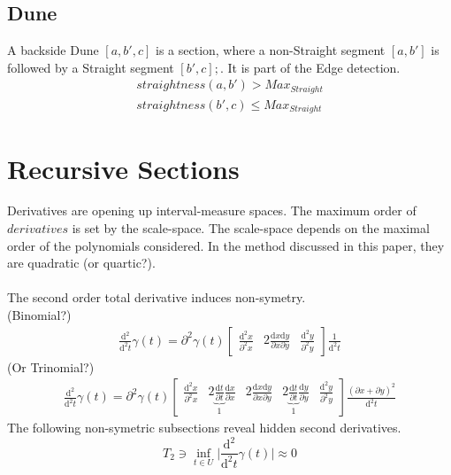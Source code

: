 \documentclass{report}
\begin{document}
\subsection{Dune}
A backside Dune $[a,b',c]$ is a section, where a non-Straight segment $[a,b']$ is followed by a Straight segment $[b',c]; $. It is part of the Edge detection.
\begin{align}
straightness(a,b')>Max_{Straight}\\ straightness(b',c)\leq Max_{Straight}
\end{align}

\section{Recursive Sections}
Derivatives are opening up interval-measure spaces. The maximum order of $derivatives$ is set by the scale-space. The scale-space depends on the maximal order of the polynomials considered. In the method discussed in this paper, they are quadratic (or quartic?).\\\\
The second order total derivative induces non-symetry.\\
(Binomial?)
\begin{align}
\frac{\mathrm{d}^2}{\mathrm{d}^2t}\gamma(t)=\partial^2 \gamma(t) \begin{bmatrix} \frac{\mathrm{d}^2x}{\partial^2 x} & 2 \frac{\mathrm{d}x\mathrm{d}y}{\partial x \partial y} & \frac{\mathrm{d}^2y}{\partial^2 y}\end{bmatrix}\frac{1}{\mathrm{d}^2t}
\end{align}
(Or Trinomial?)
\begin{align}
\frac{\mathrm{d}^2}{\mathrm{d}^2t}\gamma(t)=\partial^2 \gamma (t) \begin{bmatrix}\frac{\mathrm{d}^2 x}{\partial^2 x} & 2 \underbrace{\frac{\mathrm{d}t}{\partial t}}_{1} \frac{\mathrm{d}x}{\partial x} & 2 \frac{\mathrm{d}x\mathrm{d}y}{\partial x \partial y} & 2 \underbrace{\frac{\mathrm{d}t}{\partial t}}_{1} \frac{\mathrm{d}y}{\partial y} & \frac{\mathrm{d}^2 y}{\partial^2 y}\end{bmatrix}\frac{(\partial x + \partial y)^2}{\mathrm{d}^2 t}
\end{align}
The following non-symetric subsections reveal hidden second derivatives.
\begin{equation}
T_{2} \ni \inf_{t \in U} \lvert \frac{\mathrm{d}^2}{\mathrm{d}^2t}\gamma(t) \rvert \approx 0
\end{equation}
\end{document}
